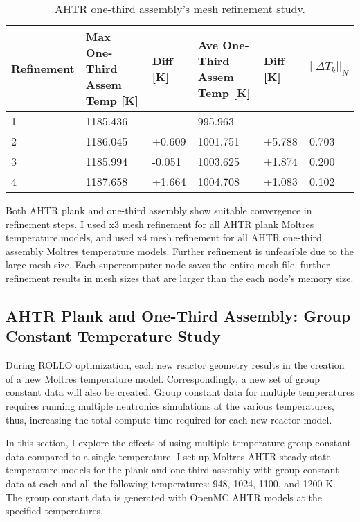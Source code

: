 \begin{table}[htbp]
    \centering
    \onehalfspacing
    \caption{\acrfull{AHTR} one-third assembly's mesh refinement study.}
	\label{tab:ahtr-assem-mesh-refinement}
    \scriptsize
    \begin{tabular}{lp{2.7cm}lp{2.7cm}ll}
    \hline 
    \textbf{Refinement} & \textbf{Max One-Third Assem Temp [K]} 
    & \textbf{Diff [K]} & \textbf{Ave One-Third Assem Temp [K]}
    & \textbf{Diff [K]} & $||\Delta T_k||_N$\\ 
    \hline 
    1 & 1185.436 & - & 995.963 & - & - \\
    2 & 1186.045 & +0.609 & 1001.751 & +5.788 & 0.703\\
    3 & 1185.994 & -0.051 & 1003.625 & +1.874 & 0.200\\ 
    4 & 1187.658 & +1.664 & 1004.708 & +1.083 & 0.102\\
    \hline
    \end{tabular}
\end{table}

Both AHTR plank and one-third assembly show suitable convergence in refinement steps. 
I used x3 mesh refinement for all AHTR plank Moltres temperature models, and 
used x4 mesh refinement for all \gls{AHTR} one-third assembly Moltres temperature 
models. 
Further refinement is unfeasible due to the large mesh size. 
Each supercomputer node saves the entire mesh file, further refinement results in 
mesh sizes that are larger than the each node's memory size. 

\subsection{AHTR Plank and One-Third Assembly: Group Constant Temperature Study}
During ROLLO optimization, each new reactor geometry results in the creation of 
a new Moltres temperature model. 
Correspondingly, a new set of group constant data will also be created. 
Group constant data for multiple temperatures requires running multiple neutronics 
simulations at the various temperatures, thus, increasing the total compute time 
required for each new reactor model. 

In this section, I explore the effects of using multiple temperature group 
constant data compared to a single temperature.
I set up Moltres AHTR steady-state temperature models for the plank and one-third 
assembly with group constant data at each and all the following temperatures: 948, 
1024, 1100, and 1200 K. 
The group constant data is generated with OpenMC \gls{AHTR} models at the specified 
temperatures. 

